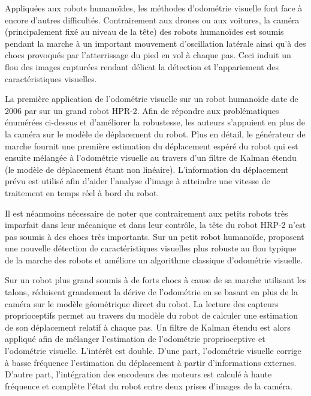 Appliquées aux robots humanoïdes, les méthodes d'odométrie visuelle
font face à encore d'autres difficultés.
Contrairement aux drones ou aux voitures, la caméra 
(principalement fixé au niveau de la tête) des robots humanoïdes 
est soumis pendant la marche à un important mouvement d'oscillation 
latérale ainsi qu'à des chocs provoqués par l'atterrissage du pied en vol
à chaque pas. 
Ceci induit un flou des images capturées rendant délicat la détection 
et l'appariement des caractéristiques visuelles.

La première application de l'odométrie visuelle sur un robot humanoïde
date de 2006 par \cite{stasse_real-time_2006} sur un grand robot HPR-2.
Afin de répondre aux problématiques énumérées ci-dessus et d'améliorer la
robustesse, les auteurs s'appuient en plus de la caméra sur le modèle de
déplacement du robot.
Plus en détail, le générateur de marche fournit une première
estimation du déplacement espéré du robot qui est ensuite mélangée à l'odométrie
visuelle au travers d'un filtre de Kalman étendu (le modèle 
de déplacement étant non linéaire).
L'information du déplacement prévu est utilisé afin d'aider l'analyse d'image
à atteindre une vitesse de traitement en temps réel à bord du robot.

Il est néanmoins nécessaire de noter que contrairement aux petits robots
très imparfait dans leur mécanique et dans leur contrôle, la tête du robot HRP-2
n'est pas soumis à des chocs très importants.
Sur un petit robot humanoïde, \cite{pretto_visual_2009} proposent
une nouvelle détection de caractéristiques visuelles plus robuste au flou
typique de la marche des robots et améliore un algorithme classique
d'odométrie visuelle.

Sur un robot plus grand soumis à de forts chocs à cause de sa marche 
utilisant les talons, \cite{ahn_-board_2012} réduisent grandement
la dérive de l'odométrie en se basant en plus de la caméra sur le modèle 
géométrique direct du robot.
La lecture des capteurs proprioceptifs permet au travers du modèle
du robot de calculer une estimation de son déplacement relatif à chaque pas.
Un filtre de Kalman étendu est alors appliqué afin de mélanger
l'estimation de l'odométrie proprioceptive et l'odométrie visuelle.
L'intérêt est double. D'une part, l'odométrie visuelle corrige à 
\og basse fréquence \fg l'estimation du déplacement à partir 
d'informations externes.
D'autre part, l'intégration des encodeurs des moteurs est
calculé à \og haute fréquence \fg et complète l'état du robot entre
deux prises d'images de la caméra.

